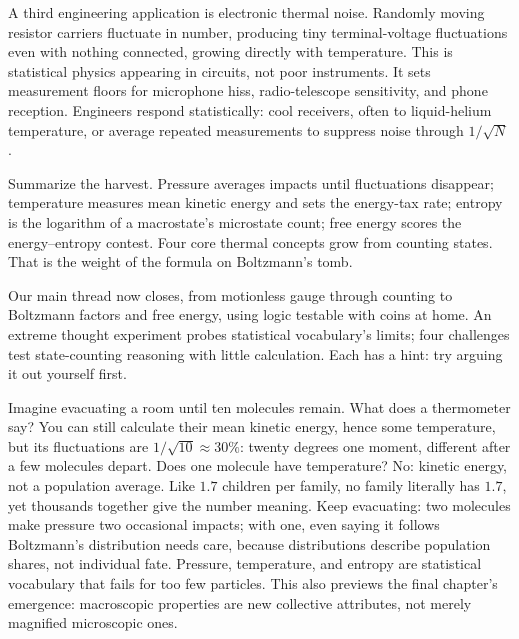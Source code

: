 A third engineering application is electronic thermal noise. Randomly moving resistor carriers fluctuate in number, producing tiny terminal-voltage fluctuations even with nothing connected, growing directly with temperature. This is statistical physics appearing in circuits, not poor instruments. It sets measurement floors for microphone hiss, radio-telescope sensitivity, and phone reception. Engineers respond statistically: cool receivers, often to liquid-helium temperature, or average repeated measurements to suppress noise through \(1/\sqrt{N}\).

Summarize the harvest. Pressure averages impacts until fluctuations disappear; temperature measures mean kinetic energy and sets the energy-tax rate; entropy is the logarithm of a macrostate's microstate count; free energy scores the energy--entropy contest. Four core thermal concepts grow from counting states. That is the weight of the formula on Boltzmann's tomb.


Our main thread now closes, from motionless gauge through counting to Boltzmann factors and free energy, using logic testable with coins at home. An extreme thought experiment probes statistical vocabulary's limits; four challenges test state-counting reasoning with little calculation. Each has a hint: try arguing it out yourself first.

\begin{thought}
Imagine evacuating a room until ten molecules remain. What does a thermometer say? You can still calculate their mean kinetic energy, hence some temperature, but its fluctuations are \(1/\sqrt{10}\approx30\%\): twenty degrees one moment, different after a few molecules depart. Does one molecule have temperature? No: kinetic energy, not a population average. Like \(1.7\) children per family, no family literally has \(1.7\), yet thousands together give the number meaning. Keep evacuating: two molecules make pressure two occasional impacts; with one, even saying it follows Boltzmann's distribution needs care, because distributions describe population shares, not individual fate. Pressure, temperature, and entropy are statistical vocabulary that fails for too few particles. This also previews the final chapter's emergence: macroscopic properties are new collective attributes, not merely magnified microscopic ones.
\end{thought}

